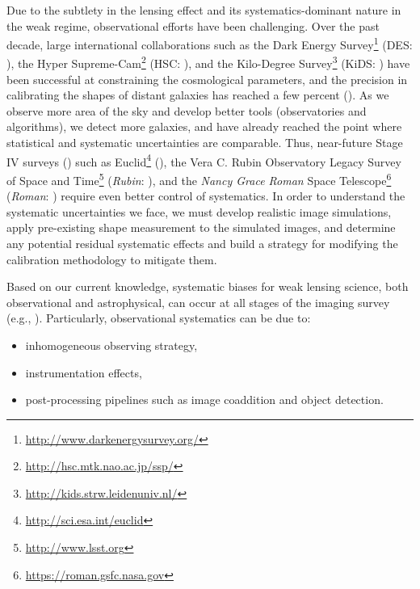 \documentclass[fleqn,usenatbib]{mnras}
\begin{document}
Due to the subtlety in the lensing effect and its systematics-dominant nature in the weak regime, observational efforts have been challenging. Over the past decade, large international collaborations such as the Dark Energy Survey\footnote{\url{http://www.darkenergysurvey.org/}} (DES: \citealt{2005astro.ph.10346T}), the Hyper Supreme-Cam\footnote{\url{http://hsc.mtk.nao.ac.jp/ssp/}} (HSC: \citealt{2018PASJ...70S...4A}), and the Kilo-Degree Survey\footnote{\url{http://kids.strw.leidenuniv.nl/}} (KiDS: \citealt{2013ExA....35...25D}) have been successful at constraining the cosmological parameters, and the precision in calibrating the shapes of distant galaxies has reached a few percent (\citealt{2020arXiv201103408G, 2020arXiv201208567M, 2021A&A...645A.105G}). As we observe more area of the sky and develop better tools (observatories and algorithms), we detect more galaxies, and have already reached the point where statistical and systematic uncertainties are comparable. Thus, near-future Stage IV surveys (\citealt{2006astro.ph..9591A}) such as Euclid\footnote{\url{ http://sci.esa.int/euclid}} (\citealt{2011arXiv1110.3193L}), the Vera C. Rubin Observatory Legacy Survey of Space and Time\footnote{\url{ http://www.lsst.org}} (\emph{Rubin}: \citealt{2009arXiv0912.0201L, 2019ApJ...873..111I}), and the \emph{Nancy Grace Roman} Space Telescope\footnote{\url{https://roman.gsfc.nasa.gov}} (\emph{Roman}: \citealt{2015arXiv150303757S}) require even better control of systematics. In order to understand the systematic uncertainties we face, we must develop realistic image simulations, apply pre-existing shape measurement to the simulated images, and determine any potential residual systematic effects and build a strategy for modifying the calibration methodology to mitigate them.  


Based on our current knowledge, systematic biases for weak lensing science, both observational and astrophysical, can occur at all stages of the imaging survey (e.g., \citealt{2018ARA&A..56..393M}). Particularly, observational systematics can be due to: 
\begin{itemize}
    \item inhomogeneous observing strategy,
    \item instrumentation effects,
    \item post-processing pipelines such as image coaddition and object detection.
\end{itemize} 
\end{document}
